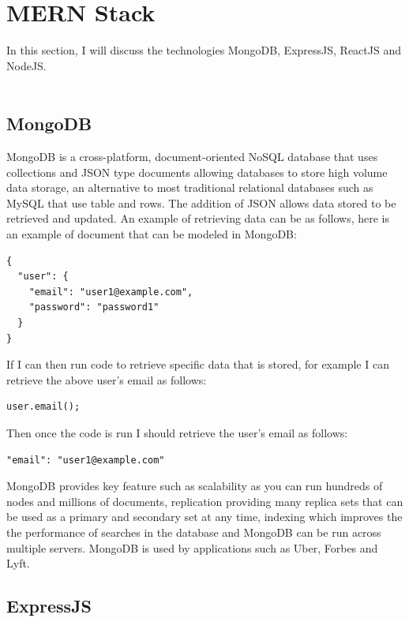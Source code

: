 \section{MERN Stack}

In this section, I will discuss the technologies MongoDB, ExpressJS, ReactJS and NodeJS.\\ \\

\subsection{MongoDB}

MongoDB is a cross-platform, document-oriented NoSQL database that uses collections and JSON type documents allowing databases to store high volume data storage, an alternative to most traditional relational databases such as MySQL that use table and rows. The addition of JSON allows data stored to be retrieved and updated. An example of retrieving data can be as follows, here is an example of document that can be modeled in MongoDB:
\begin{verbatim}
{
  "user": {
    "email": "user1@example.com",
    "password": "password1"
  }
}
\end{verbatim}
If I can then run code to retrieve specific data that is stored, for example I can retrieve the above user's email as follows:
\begin{verbatim}
user.email();
\end{verbatim}
Then once the code is run I should retrieve the user's email as follows:
\begin{verbatim}
"email": "user1@example.com"
\end{verbatim}
MongoDB provides key feature such as scalability as you can run hundreds of nodes and millions of documents, replication providing many replica sets that can be used as a primary and secondary set at any time, indexing which improves the  the performance of searches in the database and MongoDB can be run across multiple servers. MongoDB is used by applications such as Uber, Forbes and Lyft.
\subsection{ExpressJS}

